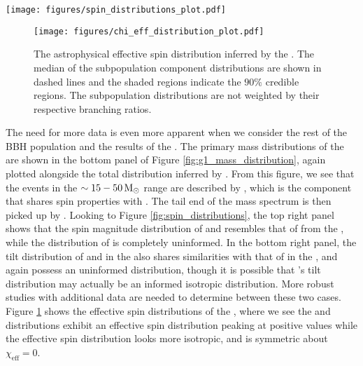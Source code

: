 \begin{figure*}[ht!]
    \begin{centering}
        \texttt{[image: figures/spin\_distributions\_plot.pdf]}
        \caption{The astrophysical spin magnitude and tilt distributions inferred by the \base{} (top left and bottom left) and the \comp{} (top right and bottom right). In each panel, the median of the subpopulation component distributions are shown in dashed lines and the shaded regions indicate the $90\%$ credible regions. The subpopulation distributions are not weighted by their respective branching ratios.}
        \label{fig:spin_distributions}
    \end{centering}
\end{figure*}

\begin{figure}[hb]
    \begin{centering}
        \texttt{[image: figures/chi\_eff\_distribution\_plot.pdf]}
        \caption{The astrophysical effective spin distribution inferred by the \comp{}. The median of the subpopulation component distributions are shown in dashed lines and the shaded regions indicate the $90\%$ credible regions. The subpopulation distributions are not weighted by their respective branching ratios.}
        \label{fig:chi_eff_distributions}
    \end{centering}
\end{figure}


The need for more data is even more apparent when we consider the rest of the BBH population and the results of the \comp{}. The primary mass distributions of the \comp{} are shown in the bottom panel of Figure \ref{fig:g1_mass_distribution}, again plotted alongside the total distribution inferred by \brucepaper{}. From this figure, we see that the events in the $\sim15-50 {\,\rm M}_\odot$ range are described by \contA{}, which is the component that shares spin properties with \first{}. The tail end of the mass spectrum is then picked up by \contB{}. Looking to Figure \ref{fig:spin_distributions}, the top right panel shows that the spin magnitude distribution of \first{} and \contA{} resembles that of \first{} from the \base{}, while the distribution of \contB{} is completely uninformed. In the bottom right panel, the tilt distribution of \first{} and \contA{} in the \comp{} also shares similarities with that of \first{} in the \base{}, and again \contB{} possess an uninformed distribution, though it is possible that \contB{}'s tilt distribution may actually be an informed isotropic distribution. More robust studies with additional data are needed to determine between these two cases. Figure \ref{fig:chi_eff_distributions} shows the effective spin distributions of the \comp{}, where we see the \first{} and \contA{} distributions exhibit an effective spin distribution peaking at positive values while the \contB{} effective spin distribution looks more isotropic, and is symmetric about $\chi_\mathrm{eff} = 0$.

